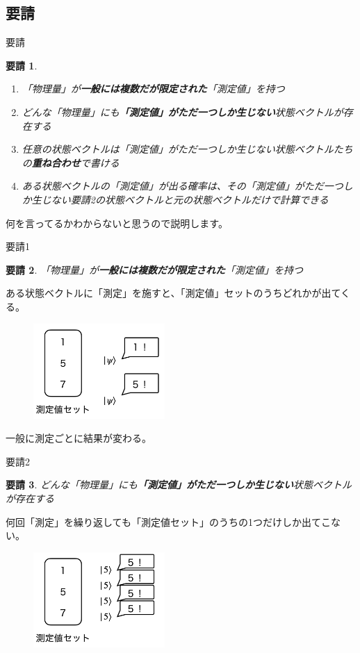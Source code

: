 \documentclass[dvipdfm]{beamer}
\newtheorem*{requirement}{要請}
\begin{document}
\subsection{要請}

\begin{frame}{要請}
    \begin{requirement}
        \begin{enumerate}
            \item 「物理量」が\textbf{一般には複数だが限定された}「測定値」を持つ
            \item どんな「物理量」にも\textbf{「測定値」がただ一つしか生じない}状態ベクトルが存在する
            \item 任意の状態ベクトルは「測定値」がただ一つしか生じない状態ベクトルたちの\textbf{重ね合わせ}で書ける
            \item ある状態ベクトルの「測定値」が出る確率は、その「測定値」がただ一つしか生じない要請2の状態ベクトルと元の状態ベクトルだけで計算できる
        \end{enumerate}
    \end{requirement}
    何を言ってるかわからないと思うので説明します。
\end{frame}

\begin{frame}{要請1}
    \begin{requirement}
        「物理量」が\textbf{一般には複数だが限定された}「測定値」を持つ
    \end{requirement}
    ある状態ベクトルに「測定」を施すと、「測定値」セットのうちどれかが出てくる。
    \begin{figure}
        \centering
        \includegraphics[width=5cm]{measurement.png}
    \end{figure}
    一般に測定ごとに結果が変わる。
\end{frame}

\begin{frame}{要請2}
    \begin{requirement}
        どんな「物理量」にも\textbf{「測定値」がただ一つしか生じない}状態ベクトルが存在する
    \end{requirement}
    何回「測定」を繰り返しても「測定値セット」のうちの1つだけしか出てこない。
    \begin{figure}
        \centering
        \includegraphics[width=5cm]{eigenmeasurement.png}
    \end{figure}
\end{frame}
\end{document}
